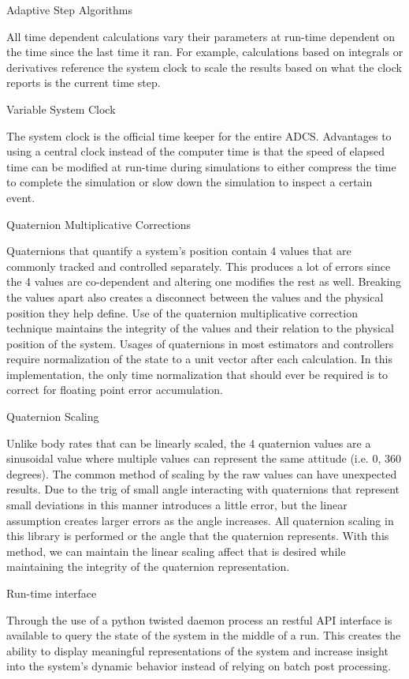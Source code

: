 Adaptive Step Algorithms

All time dependent calculations vary their parameters at run-time dependent on the time since the last time it ran. For example, calculations based on integrals or derivatives reference the system clock to scale the results based on what the clock reports is the current time step.

Variable System Clock

The system clock is the official time keeper for the entire ADCS. Advantages to using a central clock instead of the computer time is that the speed of elapsed time can be modified at run-time during simulations to either compress the time to complete the simulation or slow down the simulation to inspect a certain event.

Quaternion Multiplicative Corrections

Quaternions that quantify a system's position contain 4 values that are commonly tracked and controlled separately. This produces a lot of errors since the 4 values are co-dependent and altering one modifies the rest as well. Breaking the values apart also creates a disconnect between the values and the physical position they help define. Use of the quaternion multiplicative correction technique maintains the integrity of the values and their relation to the physical position of the system. Usages of quaternions in most estimators and controllers require normalization of the state to a unit vector after each calculation. In this implementation, the only time normalization that should ever be required is to correct for floating point error accumulation.

Quaternion Scaling

Unlike body rates that can be linearly scaled, the 4 quaternion values are a sinusoidal value where multiple values can represent the same attitude (i.e. 0, 360 degrees). The common method of scaling by the raw values can have unexpected results. Due to the trig of small angle interacting with quaternions that represent small deviations in this manner introduces a little error, but the linear assumption creates larger errors as the angle increases. All quaternion scaling in this library is performed or the angle that the quaternion represents. With this method, we can maintain the linear scaling affect that is desired while maintaining the integrity of the quaternion representation.

Run-time interface

Through the use of a python twisted daemon process an restful API interface is available to query the state of the system in the middle of a run. This creates the ability to display meaningful representations of the system and increase insight into the system's dynamic behavior instead of relying on batch post processing.

